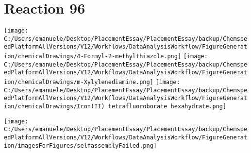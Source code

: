 \documentclass{article}%
\begin{document}
\section*{Reaction 96}%
%
\begin{scheme}[H]%
\begin{minipage}{0.5\textwidth}%
\texttt{[image: C:/Users/emanuele/Desktop/PlacementEssay/PlacementEssay/backup/ChemspeedPlatformAllVersions/V12/Workflows/DataAnalysisWorkflow/FigureGeneration/chemicalDrawings/4-Formyl-2-methylthiazole.png]}%
\texttt{[image: C:/Users/emanuele/Desktop/PlacementEssay/PlacementEssay/backup/ChemspeedPlatformAllVersions/V12/Workflows/DataAnalysisWorkflow/FigureGeneration/chemicalDrawings/m-Xylylenediamine.png]}%
\texttt{[image: C:/Users/emanuele/Desktop/PlacementEssay/PlacementEssay/backup/ChemspeedPlatformAllVersions/V12/Workflows/DataAnalysisWorkflow/FigureGeneration/chemicalDrawings/Iron(II) tetrafluoroborate hexahydrate.png]}%
\end{minipage}%
\begin{minipage}{0.5\textwidth}%
\begin{center}%
\texttt{[image: C:/Users/emanuele/Desktop/PlacementEssay/PlacementEssay/backup/ChemspeedPlatformAllVersions/V12/Workflows/DataAnalysisWorkflow/FigureGeneration/imagesForFigures/selfassemblyFailed.png]}%
\end{center}%
\end{minipage}%
\caption{Self-assembly of components 1, 18, with Iron(II) in a 3.0:1.5:1.0 molar ratio in CH$_3$CN at 60\textdegree C for 40h. These are the reagents (starting materials) for reaction 96.}%
\end{scheme}%
\end{document}
